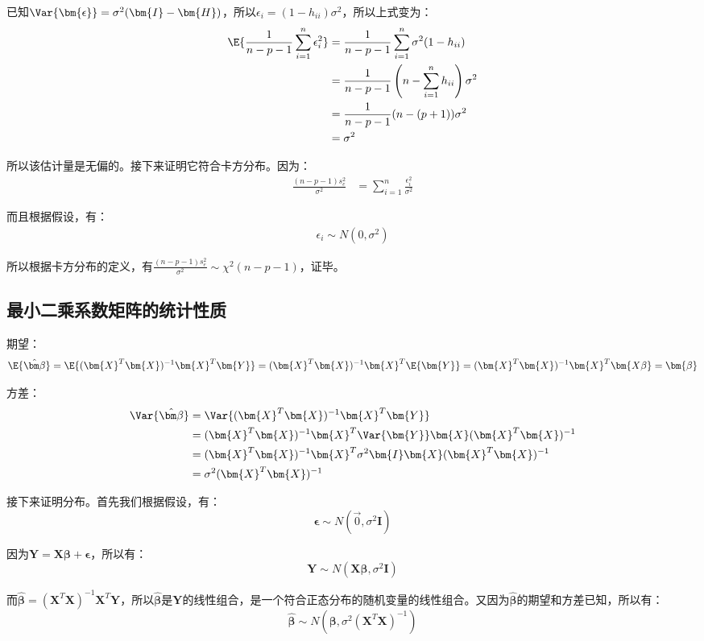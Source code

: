 \documentclass{MGLSA-cn-book-math}
\begin{document}
已知$\Var{\bm{\epsilon}}=\sigma^2(\bm{I}-\bm{H})$，所以$\epsilon_i=(1-h_{ii})\sigma^2$，所以上式变为：
\begin{align*}
	\E{\frac{1}{n-p-1}\sum_{i=1}^n\epsilon_i^2}&=\frac{1}{n-p-1}\sum_{i=1}^n\sigma^2(1-h_{ii}) \\
	&=\frac{1}{n-p-1}\left(n-\sum_{i=1}^nh_{ii}\right)\sigma^2 \\
	&=\frac{1}{n-p-1}(n-(p+1))\sigma^2 \\
	&=\sigma^2
\end{align*}

所以该估计量是无偏的。接下来证明它符合卡方分布。因为：
\begin{align*}
	\frac{(n-p-1)s_e^2}{\sigma^2}&=\sum_{i=1}^n\frac{\epsilon_i^2}{\sigma^2}
\end{align*}

而且根据假设，有：
\begin{align*}
	\epsilon_i\sim N(0, \sigma^2)
\end{align*}

所以根据卡方分布的定义，有$\frac{(n-p-1)s_e^2}{\sigma^2}\sim\chi^2(n-p-1)$，证毕。

\subsection{最小二乘系数矩阵的统计性质}
\label{proof:LSE-beta-prop}
期望：
\[
	\E{\hat{\bm\beta}}=\E{(\bm{X}^T\bm{X})^{-1}\bm{X}^T\bm{Y}}=(\bm{X}^T\bm{X})^{-1}\bm{X}^T\E{\bm{Y}}=(\bm{X}^T\bm{X})^{-1}\bm{X}^T\bm{X\beta}=\bm{\beta}
\]

方差：
\begin{align*}
	\Var{\hat{\bm\beta}}&=\Var{(\bm{X}^T\bm{X})^{-1}\bm{X}^T\bm{Y}} \\
	&=(\bm{X}^T\bm{X})^{-1}\bm{X}^T\Var{\bm{Y}}\bm{X}(\bm{X}^T\bm{X})^{-1} \\
	&=(\bm{X}^T\bm{X})^{-1}\bm{X}^T\sigma^2\bm{I}\bm{X}(\bm{X}^T\bm{X})^{-1} \\
	&=\sigma^2(\bm{X}^T\bm{X})^{-1}
\end{align*}

接下来证明分布。首先我们根据假设，有：
\[
	\bm{\epsilon}\sim N(\vec{0}, \sigma^2\bm{I})
\]

因为$\bm{Y}=\bm{X\beta}+\bm{\epsilon}$，所以有：
\[
	\bm{Y}\sim N(\bm{X\beta}, \sigma^2\bm{I})
\]

而$\hat{\bm\beta}=(\bm{X}^T\bm{X})^{-1}\bm{X}^T\bm{Y}$，所以$\hat{\bm\beta}$是$\bm{Y}$的线性组合，是一个符合正态分布的随机变量的线性组合。又因为$\hat{\bm\beta}$的期望和方差已知，所以有：
\[
	\hat{\bm\beta}\sim N(\bm{\beta}, \sigma^2(\bm{X}^T\bm{X})^{-1})
\]
\end{document}
